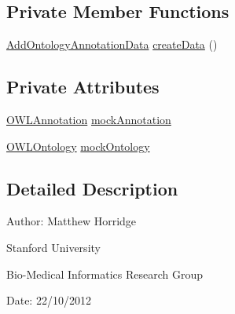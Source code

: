 \subsection*{Private Member Functions}
\begin{DoxyCompactItemize}
\item 
\hyperlink{classorg_1_1semanticweb_1_1owlapi_1_1change_1_1_add_ontology_annotation_data}{Add\-Ontology\-Annotation\-Data} \hyperlink{classorg_1_1semanticweb_1_1owlapi_1_1api_1_1test_1_1annotations_1_1_add_ontology_annotation_data_test_case_a49a6a14449913c52ae4fb11e3bb6493c}{create\-Data} ()
\end{DoxyCompactItemize}
\subsection*{Private Attributes}
\begin{DoxyCompactItemize}
\item 
\hyperlink{interfaceorg_1_1semanticweb_1_1owlapi_1_1model_1_1_o_w_l_annotation}{O\-W\-L\-Annotation} \hyperlink{classorg_1_1semanticweb_1_1owlapi_1_1api_1_1test_1_1annotations_1_1_add_ontology_annotation_data_test_case_a41aa206569bfab065733893c8512c8d6}{mock\-Annotation}
\item 
\hyperlink{interfaceorg_1_1semanticweb_1_1owlapi_1_1model_1_1_o_w_l_ontology}{O\-W\-L\-Ontology} \hyperlink{classorg_1_1semanticweb_1_1owlapi_1_1api_1_1test_1_1annotations_1_1_add_ontology_annotation_data_test_case_a4d04ca5b7700d630ddc604ce442e4650}{mock\-Ontology}
\end{DoxyCompactItemize}


\subsection{Detailed Description}
Author\-: Matthew Horridge\par
 Stanford University\par
 Bio-\/\-Medical Informatics Research Group\par
 Date\-: 22/10/2012 


